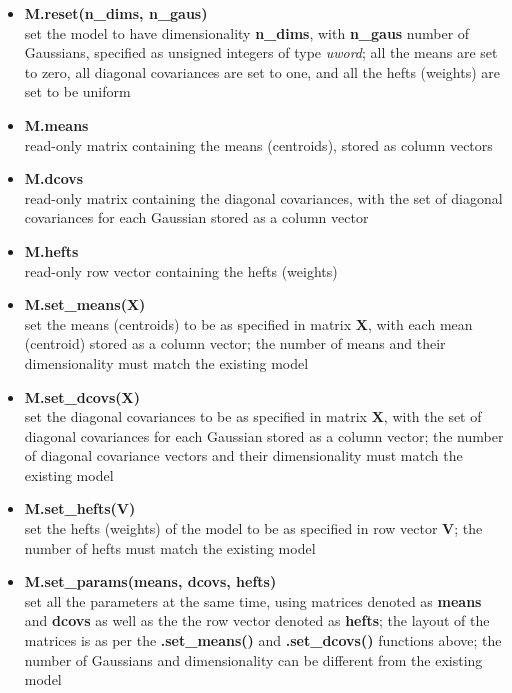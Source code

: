 \begin{small}
\begin{itemize}
\item
{\bf M.reset(n\_dims, n\_gaus)}\\
set the model to have dimensionality {\bf n\_dims}, with {\bf n\_gaus} number of Gaussians, specified as unsigned integers of type {\it uword};
all the means are set to zero, all diagonal covariances are set to one, and all the hefts (weights) are set to be uniform

\item
{\bf M.means}\\
read-only matrix containing the means (centroids), stored as column vectors

\item
{\bf M.dcovs}\\
read-only matrix containing the diagonal covariances, with the set of diagonal covariances for each Gaussian stored as a column vector

\item
{\bf M.hefts}\\
read-only row vector containing the hefts (weights)

\item
{\bf M.set\_means(X)}\\
set the means (centroids) to be as specified in matrix {\bf X}, with each mean (centroid) stored as a column vector;
the number of means and their dimensionality must match the existing model

\item
{\bf M.set\_dcovs(X)}\\
set the diagonal covariances to be as specified in matrix {\bf X}, with the set of diagonal covariances for each Gaussian stored as a column vector;
the number of diagonal covariance vectors and their dimensionality must match the existing model

\item
{\bf M.set\_hefts(V)}\\
set the hefts (weights) of the model to be as specified in row vector {\bf V};
the number of hefts must match the existing model

\item
{\bf M.set\_params(means, dcovs, hefts)}\\
set all the parameters at the same time, using matrices denoted as {\bf means} and {\bf dcovs} as well as the the row vector denoted as {\bf hefts};
the layout of the matrices is as per the {\bf .set\_means()} and {\bf .set\_dcovs()} functions above;
the number of Gaussians and dimensionality can be different from the existing model


\end{itemize}
\end{small}
